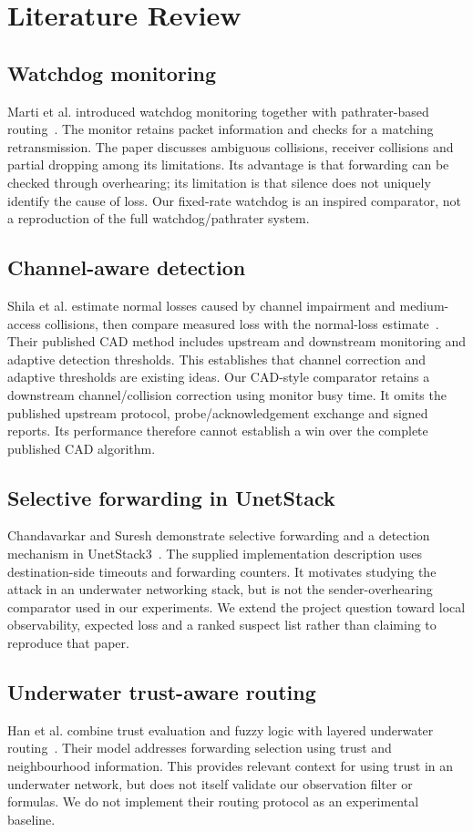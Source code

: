 \documentclass{article}
\begin{document}
\section{Literature Review}\label{sec:related}
\subsection{Watchdog monitoring}
Marti et al. introduced watchdog monitoring together with pathrater-based routing~\cite{marti}. The monitor retains packet information and checks for a matching retransmission. The paper discusses ambiguous collisions, receiver collisions and partial dropping among its limitations. Its advantage is that forwarding can be checked through overhearing; its limitation is that silence does not uniquely identify the cause of loss. Our fixed-rate watchdog is an inspired comparator, not a reproduction of the full watchdog/pathrater system.

\subsection{Channel-aware detection}
Shila et al. estimate normal losses caused by channel impairment and medium-access collisions, then compare measured loss with the normal-loss estimate~\cite{cad}. Their published CAD method includes upstream and downstream monitoring and adaptive detection thresholds. This establishes that channel correction and adaptive thresholds are existing ideas. Our CAD-style comparator retains a downstream channel/collision correction using monitor busy time. It omits the published upstream protocol, probe/acknowledgement exchange and signed reports. Its performance therefore cannot establish a win over the complete published CAD algorithm.

\subsection{Selective forwarding in UnetStack}
Chandavarkar and Suresh demonstrate selective forwarding and a detection mechanism in UnetStack3~\cite{brc}. The supplied implementation description uses destination-side timeouts and forwarding counters. It motivates studying the attack in an underwater networking stack, but is not the sender-overhearing comparator used in our experiments. We extend the project question toward local observability, expected loss and a ranked suspect list rather than claiming to reproduce that paper.

\subsection{Underwater trust-aware routing}
Han et al. combine trust evaluation and fuzzy logic with layered underwater routing~\cite{han}. Their model addresses forwarding selection using trust and neighbourhood information. This provides relevant context for using trust in an underwater network, but does not itself validate our observation filter or formulas. We do not implement their routing protocol as an experimental baseline.
\end{document}
